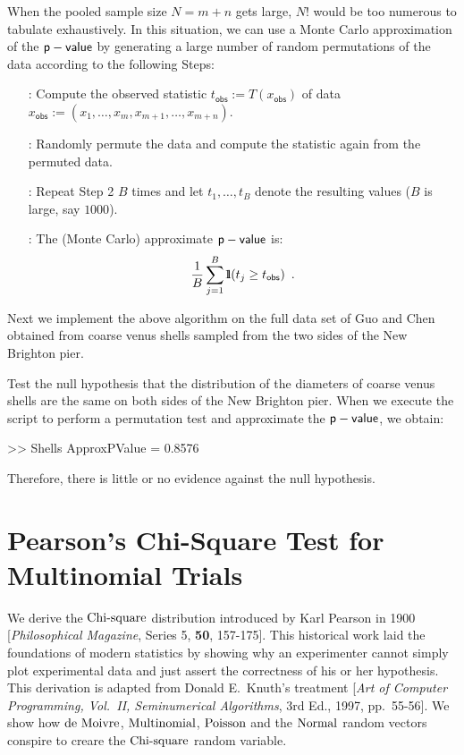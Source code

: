 When the pooled sample size $N=m+n$ gets large, $N!$ would be too numerous to tabulate exhaustively.  In this situation, we can use a Monte Carlo approximation of the $\mathsf{p-value}$ by generating a large number of random permutations of the data according to the following Steps:

\begin{enumerate}
\item[\sf{Step 1}:] Compute the observed statistic $t_{\mathsf{obs}} := T(x_{\mathsf{obs}})$ of data $x_{\mathsf{obs}}:=(x_1,\ldots,x_m,x_{m+1},\ldots,x_{m+n})$.
\item[\sf{Step 2}:] Randomly permute the data and compute the statistic again from the permuted data.
\item[\sf{Step 3}:] Repeat {\sf Step 2} $B$ times and let $t_1,\ldots,t_B$ denote the resulting values ($B$ is large, say $1000$).
\item[\sf{Step 4}:] The (Monte Carlo) approximate $\mathsf{p-value}$ is:
\[
\frac{1}{B} \sum_{j=1}^B {1}\mspace{-11 mu}{1}(t_j \geq t_{\mathsf{obs}} ) \enspace .
\]
\end{enumerate}
Next we implement the above algorithm on the full data set of Guo and Chen obtained from coarse venus shells sampled from the two sides of the New Brighton pier. 
\begin{labwork}\label{LW:Shells}
Test the null hypothesis that the distribution of the diameters of coarse venus shells are the same on both sides of the New Brighton pier. 
When we execute the script to perform a permutation test and approximate the $\mathsf{p-value}$, we obtain:
\begin{VrbM}
>> Shells
ApproxPValue =    0.8576
\end{VrbM}
Therefore, there is little or no evidence against the null hypothesis.
\end{labwork}

\section{Pearson's Chi-Square Test for Multinomial Trials}\label{S:Chi2}

We derive the $\mbox{{\rm Chi-square}}$ distribution introduced by Karl Pearson in 1900 [{\em Philosophical Magazine}, Series 5, {\bf 50}, 157-175].  This historical work laid the foundations of modern statistics by showing why an experimenter cannot simply plot experimental data and just assert the correctness of his or her hypothesis.  This derivation is adapted from Donald E.~Knuth's treatment [{\em Art of Computer Programming, Vol.~II, Seminumerical Algorithms}, 3rd Ed., 1997, pp.~55-56].  We show how $\mbox{{\rm de~Moivre}}$, $\mbox{{\rm Multinomial}}$, $\mbox{{\rm Poisson}}$ and the $\mbox{{\rm Normal}}$ random vectors conspire to creare the $\mbox{{\rm Chi-square}}$ random variable.

